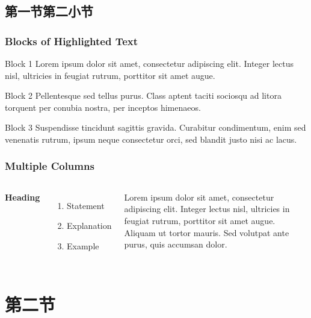 \documentclass[11pt]{beamer}
\numberwithin{thm}{section}
\numberwithin{defn}{section}
\numberwithin{lmm}{section}
\theoremstyle{example}
\numberwithin{figure}{section}
\numberwithin{table}{section}
\numberwithin{equation}{section}
\begin{document}
\subsection{第一节第二小节}
\begin{frame}
\frametitle{Blocks of Highlighted Text}
\begin{block}{Block 1}
Lorem ipsum dolor sit amet, consectetur adipiscing elit. Integer lectus nisl, ultricies in feugiat rutrum, porttitor sit amet augue.
\end{block}

\begin{exampleblock}{Block 2}
Pellentesque sed tellus purus. Class aptent taciti sociosqu ad litora torquent per conubia nostra, per inceptos himenaeos.
\end{exampleblock}

\begin{alertblock}{Block 3}
Suspendisse tincidunt sagittis gravida. Curabitur condimentum, enim sed venenatis rutrum, ipsum neque consectetur orci, sed blandit justo nisi ac lacus.
\end{alertblock}
\end{frame}


\begin{frame}
\frametitle{Multiple Columns}
\begin{columns}[c] %

\textbf{Heading}
\begin{enumerate}
\item Statement
\item Explanation
\item Example
\end{enumerate}

Lorem ipsum dolor sit amet, consectetur adipiscing elit. Integer lectus nisl, ultricies in feugiat rutrum, porttitor sit amet augue. Aliquam ut tortor mauris. Sed volutpat ante purus, quis accumsan dolor.

\end{columns}
\end{frame}

\section{第二节}
\end{document}
